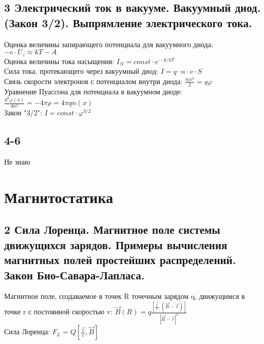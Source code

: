 \documentclass[a4paper,12pt]{article}
\begin{document}
\subsection{3	Электрический ток в вакууме. Вакуумный диод. (Закон 3/2). Выпрямление электрического тока.}
Оценка величины запирающего потенциала для вакуумного диода: $-e\cdot U_z \approx kT - A$\\
Оценка величины тока насыщения: $I_N = const \cdot e^{-A/kT}$\\
Сила тока, протекающего через вакуумный диод: $I = q\cdot n \cdot v \cdot S$\\
Связь скорости электронов с потенциалом внутри диода: $\frac{mv^2}{2} = q \varphi$\\
Уравнение Пуассона для потенциала в вакуумном диоде: $\frac{d^2\varphi (x)}{dx^2} = - 4\pi \rho = 4 \pi q n (x)$\\
Закон "3/2": $I = const \cdot \varphi ^{3/2}$\\

\subsection{4-6}
Не знаю

\section{Магнитостатика}
\subsection{2  Сила Лоренца. Магнитное поле системы движущихся зарядов. Примеры вычисления магнитных полей простейших распределений. Закон Био-Савара-Лапласа.}
Магнитное поле, создаваемое в точек R точечным зарядом q, движущимся в точке r с постоянной скоростью v: $\vec{B}(R) = q \frac{[\frac{\vec{v}}{c} , (\vec{R} - \vec{r})]}{|\vec{R} - \vec{r}|^3}$\\
Сила Лоренца: $F_L = Q \left[ \frac{\vec{v}}{c}, \vec{B} \right]$\\
\end{document}
